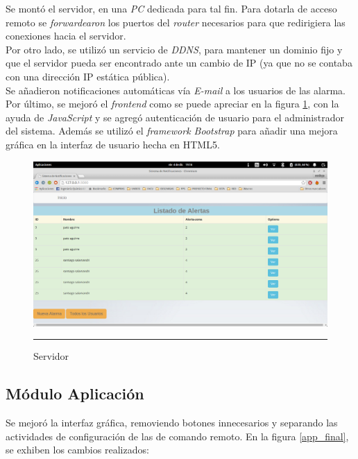 Se montó el servidor, en una \textit{PC} dedicada para tal fin. Para dotarla de acceso remoto se \textit{forwardearon} los puertos del \textit{router} necesarios para que redirigiera las conexiones hacia el servidor.\\
Por otro lado, se utilizó un servicio de \textit{DDNS}, para mantener un dominio fijo y que el servidor pueda ser encontrado ante un cambio de IP (ya que no se contaba con una dirección IP estática pública).\\
Se añadieron notificaciones automáticas vía \textit{E-mail} a los usuarios de las alarma.\\
Por último, se mejoró el \textit{frontend} como se puede apreciar en la figura \ref{servidor}, con la ayuda de \textit{JavaScript} y se agregó autenticación de usuario para el administrador del sistema. Además se utilizó el \textit{framework Bootstrap} para añadir una mejora gráfica en la interfaz de usuario hecha en HTML5. \\

\begin{figure}[htbp]
	\centering
		\includegraphics[width=1\textwidth]{Figures/servidor.png}
		\rule{35em}{1.5pt}
	\caption[Servidor]{Servidor}
\label{servidor}
\end{figure}
\newpage


\subsection{Módulo Aplicación}

Se mejoró la interfaz gráfica, removiendo botones innecesarios y separando las actividades de configuración de las de comando remoto. En la figura \ref{app_final}, se exhiben los cambios realizados:\\

